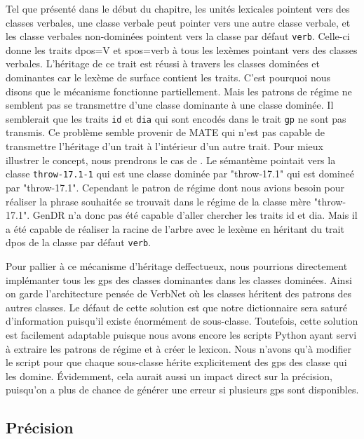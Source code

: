 Tel que présenté dans le début du chapitre, les unités lexicales pointent vers des classes verbales, une classe verbale peut pointer vers une autre classe verbale, et les classe verbales non-dominées pointent vers la classe par défaut \texttt{verb}. Celle-ci donne les traits dpos=V et spos=verb à tous les lexèmes pointant vers des classes verbales. L'héritage de ce trait est réussi à travers les classes dominées et dominantes car le lexème de surface contient les traits. C'est pourquoi nous disons que le mécanisme fonctionne partiellement. Mais les patrons de régime ne semblent pas se transmettre d'une classe dominante à une classe dominée. Il semblerait que les traits \texttt{id} et \texttt{dia} qui sont encodés dans le trait \texttt{gp} ne sont pas transmis. Ce problème semble provenir de MATE qui n'est pas capable de transmettre l'héritage d'un trait à l'intérieur d'un autre trait. Pour mieux illustrer le concept, nous prendrons le cas de . Le sémantème  pointait vers la classe \texttt{throw-17.1-1} qui est une classe dominée par "throw-17.1" qui est domineé par "throw-17.1". Cependant le patron de régime dont nous avions besoin pour réaliser la phrase souhaitée se trouvait dans le régime de la classe mère "throw-17.1". GenDR n'a donc pas été capable d'aller chercher les traits id et dia. Mais il a été capable de réaliser la racine de l'arbre avec le lexème  en héritant du trait dpos de la classe par défaut \texttt{verb}.

Pour pallier à ce mécanisme d'héritage deffectueux, nous pourrions directement implémanter tous les gps des classes dominantes dans les classes dominées. Ainsi on garde l'architecture pensée de VerbNet où les classes héritent des patrons des autres classes. Le défaut de cette solution est que notre dictionnaire sera saturé d'information puisqu'il existe énormément de sous-classe. Toutefois, cette solution est facilement adaptable puisque nous avons encore les scripts Python ayant servi à extraire les patrons de régime et à créer le lexicon. Nous n'avons qu'à modifier le script pour que chaque sous-classe hérite explicitement des gps des classe qui les domine. Évidemment, cela aurait aussi un impact direct sur la précision, puisqu'on a plus de chance de générer une erreur si plusieurs gps sont disponibles.

\subsection{Précision}

